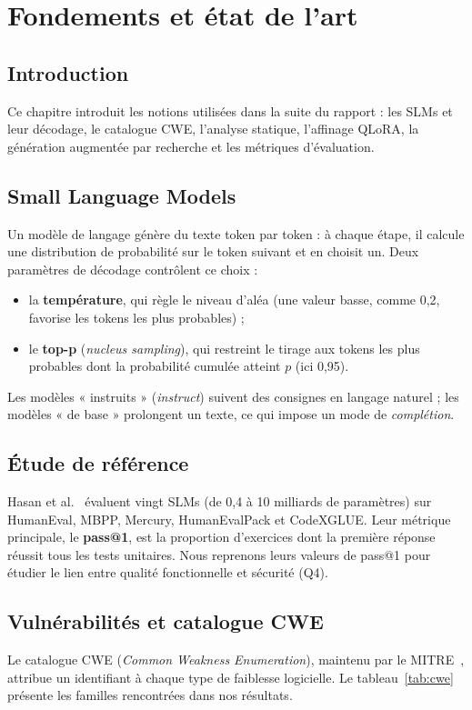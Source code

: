 \documentclass[11pt,a4paper,oneside]{report}
\newcommand{\chapintro}{\section*{Introduction}}
\begin{document}
\chapter{Fondements et état de l'art}\label{chap:fondements}
\chapintro
Ce chapitre introduit les notions utilisées dans la suite du rapport : les SLMs et leur décodage, le catalogue CWE, l'analyse statique, l'affinage QLoRA, la génération augmentée par recherche et les métriques d'évaluation.

\section{Small Language Models}
Un modèle de langage génère du texte token par token : à chaque étape, il calcule une distribution de probabilité sur le token suivant et en choisit un. Deux paramètres de décodage contrôlent ce choix :
\begin{itemize}
  \item la \textbf{température}, qui règle le niveau d'aléa (une valeur basse, comme 0,2, favorise les tokens les plus probables) ;
  \item le \textbf{top-p} (\emph{nucleus sampling}), qui restreint le tirage aux tokens les plus probables dont la probabilité cumulée atteint $p$ (ici 0,95).
\end{itemize}
Les modèles « instruits » (\emph{instruct}) suivent des consignes en langage naturel ; les modèles « de base » prolongent un texte, ce qui impose un mode de \emph{complétion}.

\section{Étude de référence}
Hasan et al.~\cite{hasan} évaluent vingt SLMs (de 0,4 à 10 milliards de paramètres) sur HumanEval, MBPP, Mercury, HumanEvalPack et CodeXGLUE. Leur métrique principale, le \textbf{pass@1}, est la proportion d'exercices dont la première réponse réussit tous les tests unitaires. Nous reprenons leurs valeurs de pass@1 pour étudier le lien entre qualité fonctionnelle et sécurité (Q4).

\section{Vulnérabilités et catalogue CWE}
Le catalogue CWE (\emph{Common Weakness Enumeration}), maintenu par le MITRE~\cite{cwe}, attribue un identifiant à chaque type de faiblesse logicielle. Le tableau~\ref{tab:cwe} présente les familles rencontrées dans nos résultats.
\end{document}
